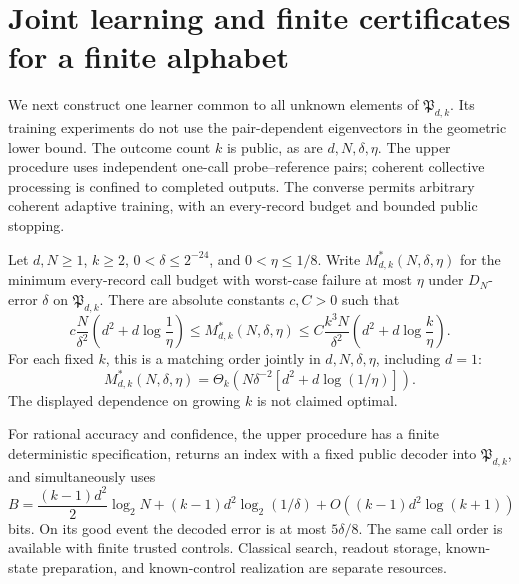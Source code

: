 \section{Joint learning and finite certificates for a finite alphabet}
\label{sec:multilearning82}

We next construct one learner common to all unknown elements of
$\mathfrak P_{d,k}$.  Its training experiments do not use the
pair-dependent eigenvectors in the geometric lower bound.
The outcome count $k$ is public, as are $d,N,\delta,\eta$.
The upper procedure uses independent one-call probe--reference pairs;
coherent collective processing is confined to completed outputs.
The converse permits arbitrary coherent adaptive training, with an
every-record budget and bounded public stopping.

\begin{theorem}
\label{thm:multioutcomelearning82}
Let $d,N\ge1$, $k\ge2$, $0<\delta\le2^{-24}$, and
$0<\eta\le1/8$.  Write $M^*_{d,k}(N,\delta,\eta)$ for the
minimum every-record call budget with worst-case failure at most
$\eta$ under $D_N$-error $\delta$ on $\mathfrak P_{d,k}$.
There are absolute constants $c,C>0$ such that
\begin{equation}\label{eq:multilearning82}
 c\frac{N}{\delta^2}\left(d^2+d\log\frac1\eta\right)
 \le M^*_{d,k}(N,\delta,\eta)
 \le C\frac{k^3N}{\delta^2}
                  \left(d^2+d\log\frac{k}{\eta}\right).
\end{equation}
For each fixed $k$, this is a matching order jointly in
$d,N,\delta,\eta$, including $d=1$:
\[
 M^*_{d,k}(N,\delta,\eta)
 =\Theta_k\!\left(N\delta^{-2}
                   [d^2+d\log(1/\eta)]\right).
\]
The displayed dependence on growing $k$ is not claimed optimal.

For rational accuracy and confidence, the upper procedure has a
finite deterministic specification, returns an index with a fixed
public decoder into $\mathfrak P_{d,k}$, and simultaneously uses
\begin{equation}\label{eq:multilearnedbits82}
 B=\frac{(k-1)d^2}{2}\log_2N
       +(k-1)d^2\log_2(1/\delta)+O((k-1)d^2\log(k+1))
\end{equation}
bits.  On its good event the decoded error is at most $5\delta/8$.
The same call order is available with finite trusted controls.
Classical search, readout storage, known-state preparation, and
known-control realization are separate resources.
\end{theorem}
